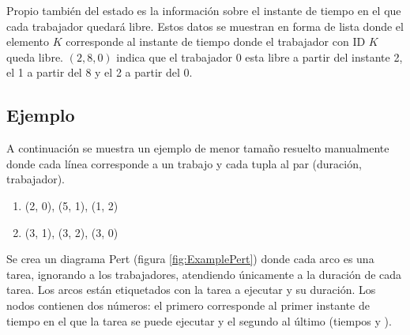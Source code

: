 Propio también del estado es la información sobre
el instante de tiempo en el que cada trabajador quedará libre.
Estos datos se muestran en forma de lista donde el elemento $K$
corresponde al instante de tiempo donde el trabajador con ID $K$
queda libre.
$(2, 8, 0)$ indica que el trabajador 0 esta libre a partir del instante 2,
el 1 a partir del 8 y el 2 a partir del 0.

\pagebreak
\subsection{Ejemplo}
\label{ssec:A*Example}

A continuación se muestra un ejemplo de menor tamaño resuelto manualmente
donde cada línea corresponde a un trabajo y cada tupla al par (duración, trabajador).

\begin{enumerate}[start=0, itemsep=0.25px]
    \item (2, 0), (5, 1), (1, 2)
    \item (3, 1), (3, 2), (3, 0)
\end{enumerate}

Se crea un diagrama Pert (figura \ref{fig:ExamplePert}) donde cada arco es una tarea,
ignorando a los trabajadores,
atendiendo únicamente a la duración de cada tarea.
Los arcos están etiquetados con la tarea a ejecutar y su duración.
Los nodos contienen dos números: el primero corresponde al primer instante de tiempo
en el que la tarea se puede ejecutar y el segundo al último
(tiempos  y ).

